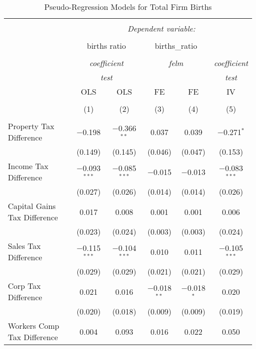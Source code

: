 
\begin{table}[!htbp] \centering 
  \caption{Pseudo-Regression Models for  Total Firm Births} 
  \label{} 
\begin{tabular}{@{\extracolsep{5pt}}lccccc} 
\\[-1.8ex]\hline 
\hline \\[-1.8ex] 
 & \multicolumn{5}{c}{\textit{Dependent variable:}} \\ 
\cline{2-6} 
\\[-1.8ex] & \multicolumn{2}{c}{births ratio} & \multicolumn{2}{c}{births\_ratio} &   \\ 
\\[-1.8ex] & \multicolumn{2}{c}{\textit{coefficient}} & \multicolumn{2}{c}{\textit{felm}} & \textit{coefficient} \\ 
 & \multicolumn{2}{c}{\textit{test}} & \multicolumn{2}{c}{\textit{}} & \textit{test} \\ 
 & OLS & OLS & FE & FE & IV \\ 
\\[-1.8ex] & (1) & (2) & (3) & (4) & (5)\\ 
\hline \\[-1.8ex] 
 Property Tax Difference & $-$0.198 & $-$0.366$^{**}$ & 0.037 & 0.039 & $-$0.271$^{*}$ \\ 
  & (0.149) & (0.145) & (0.046) & (0.047) & (0.153) \\ 
  Income Tax Difference & $-$0.093$^{***}$ & $-$0.085$^{***}$ & $-$0.015 & $-$0.013 & $-$0.083$^{***}$ \\ 
  & (0.027) & (0.026) & (0.014) & (0.014) & (0.026) \\ 
  Capital Gains Tax Difference & 0.017 & 0.008 & 0.001 & 0.001 & 0.006 \\ 
  & (0.023) & (0.024) & (0.003) & (0.003) & (0.024) \\ 
  Sales Tax Difference & $-$0.115$^{***}$ & $-$0.104$^{***}$ & 0.010 & 0.011 & $-$0.105$^{***}$ \\ 
  & (0.029) & (0.029) & (0.021) & (0.021) & (0.029) \\ 
  Corp Tax Difference & 0.021 & 0.016 & $-$0.018$^{**}$ & $-$0.018$^{*}$ & 0.020 \\ 
  & (0.020) & (0.018) & (0.009) & (0.009) & (0.019) \\ 
  Workers Comp Tax Difference & 0.004 & 0.093 & 0.016 & 0.022 & 0.050 \\ 

\end{tabular}
\end{table}
